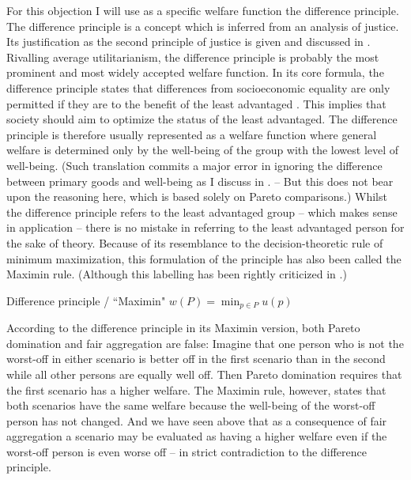 For this objection I will use as a specific welfare function the difference principle. The difference principle is a concept which is inferred from an analysis of justice. Its justification as the second principle of justice is given and discussed in \cite[pp.~3-183]{rawls_2005}. Rivalling average utilitarianism, the difference principle is probably the most prominent and most widely accepted welfare function. In its core formula, the difference principle states that differences from socioeconomic equality are only permitted if they are to the benefit of the least advantaged \cite[p.~302]{rawls_2005}. This implies that society should aim to optimize the status of the least advantaged. The difference principle is therefore usually represented as a welfare function where general welfare is determined only by the well-being of the group with the lowest level of well-being. (Such translation commits a major error in ignoring the difference between primary goods and well-being as I discuss in . – But this does not bear upon the reasoning here, which is based solely on Pareto comparisons.) Whilst the difference principle refers to the least advantaged group – which makes sense in application – there is no mistake in referring to the least advantaged person for the sake of theory. Because of its resemblance to the decision-theoretic rule of minimum maximization, this formulation of the principle has also been called the Maximin rule. (Although this labelling has been rightly criticized in .) 

\begin{Definition}{Difference principle / “Maximin"}{} 
$w(P) = \min_{p\in P} u(p)$
\end{Definition}

According to the difference principle in its Maximin version, both Pareto domination and fair aggregation are false: Imagine that one person who is not the worst-off in either scenario is better off in the first scenario than in the second while all other persons are equally well off. Then Pareto domination requires that the first scenario has a higher welfare. The Maximin rule, however, states that both scenarios have the same welfare because the well-being of the worst-off person has not changed. And we have seen above that as a consequence of fair aggregation a scenario may be evaluated as having a higher welfare even if the worst-off person is even worse off – in strict contradiction to the difference principle.  

